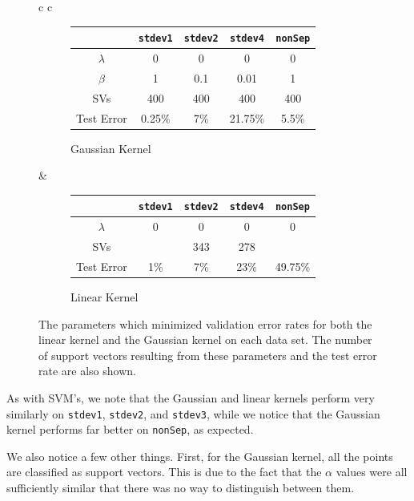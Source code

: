 \documentclass{sigchi}
\begin{document}
\begin{figure}
\centering
\renewcommand*{\arraystretch}{1.5}

\begin{tabular}{c c}
\begin{subfigure}[b]{3.5in}
\centering
	\begin{tabular}{| c | c | c | c | c |}
	\hline
	& \texttt{stdev1} & \texttt{stdev2} & \texttt{stdev4} & \texttt{nonSep}\\
	\hline
	$\lambda$ & 0 & 0 & 0 & 0 \\
	\hline
	$\beta$ & 1 & 0.1 & 0.01 & 1 \\
	\hline
	SVs & 400 & 400 & 400 & 400 \\
	\hline
	Test Error & 0.25\% & 7\% & 21.75\% & 5.5\%  \\
	\hline
	\end{tabular}
	\caption{Gaussian Kernel}
\end{subfigure}
&
\begin{subfigure}[b]{3.5in}
\centering
	\begin{tabular}{| c | c | c | c | c |}
	\hline
	& \texttt{stdev1} & \texttt{stdev2} & \texttt{stdev4} & \texttt{nonSep}\\
	\hline
	$\lambda$ & 0  & 0  & 0  & 0  \\
	\hline
	SVs & & 343 & 278 &  \\
	\hline
	Test Error & 1\% & 7\% & 23\% & 49.75\%\\
	\hline
	\end{tabular}
	\caption{Linear Kernel}
\end{subfigure}
\end{tabular}

\caption{The parameters which minimized validation error rates for both the linear kernel and the Gaussian kernel on each data set. The number of support vectors resulting from these parameters and the test error rate are also shown.}
\end{figure}


As with SVM's, we note that the Gaussian and linear kernels perform very similarly on \texttt{stdev1}, \texttt{stdev2}, and \texttt{stdev3}, while we notice that the Gaussian kernel performs far better on \texttt{nonSep}, as expected.

We also notice a few other things. First, for the Gaussian kernel, all the points are classified as support vectors. This is due to the fact that the $\alpha$ values were all sufficiently similar that there was no way to distinguish between them.
\end{document}
